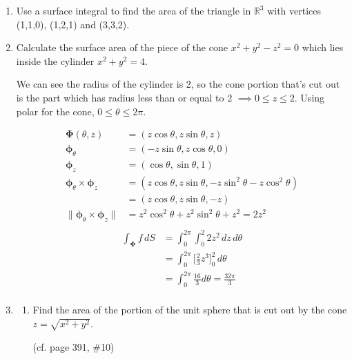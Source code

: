 \documentclass{article}
\newcommand{\norm}[1]{\| #1 \|}
\begin{document}
\begin{enumerate}
    \item Use a surface integral to find the area of the triangle in $\mathbb{R}^3$ with vertices (1,1,0), (1,2,1) and (3,3,2).

    \item Calculate the surface area of the piece of the cone $x^2+y^2-z^2 =0$ which lies inside the cylinder $x^2 + y^2 = 4$.
    
    We can see the radius of the cylinder is 2, so the cone portion that's cut out is the part which has radius less than or equal to 2 $\implies 0 \leq z \leq 2$. Using polar for the cone, $0 \leq \theta \leq 2 \pi$.
    \begin{multicols}{2}
    \noindent
    \begin{align*}
        \boldsymbol \Phi (\theta, z) &= (z\cos \theta, z\sin \theta, z) \\
        \boldsymbol \phi_\theta &= (- z \sin \theta, z \cos \theta, 0) \\
        \boldsymbol \phi_z &= ( \cos \theta, \sin \theta, 1) \\
        \boldsymbol \phi_\theta \times \boldsymbol \phi_z &= (z \cos \theta, z \sin \theta, - z \sin^2 \theta - z \cos^2 \theta) \\
        &= (z \cos \theta, z \sin \theta, - z)  \\
        \norm {\boldsymbol \phi_\theta \times \boldsymbol \phi_z }&= z^2 \cos^2 \theta + z^2 \sin^2 \theta + z^2  = 2 z^2\\
    \end{align*}
    \begin{align*}
        \int_{\boldsymbol \Phi} f \, dS &= \int_0^{2\pi} \int_0^2 2z^2 \, dz \, d\theta \\
        &= \int_0^{2\pi} \Big[ \frac{2}{3}z^3\Big]_0^2 \, d\theta \\
        &= \int_0^{2\pi} \frac{16}{3} d\theta =\frac{32\pi}{3} \\
    \end{align*}
    \end{multicols}
    \item
    \begin{enumerate}
        \item Find the area of the portion of the unit sphere that is cut out by the cone $z = \sqrt{x^2+y^2}$.

        (cf. page 391, \#10)


\end{enumerate}
\end{enumerate}
\end{document}
